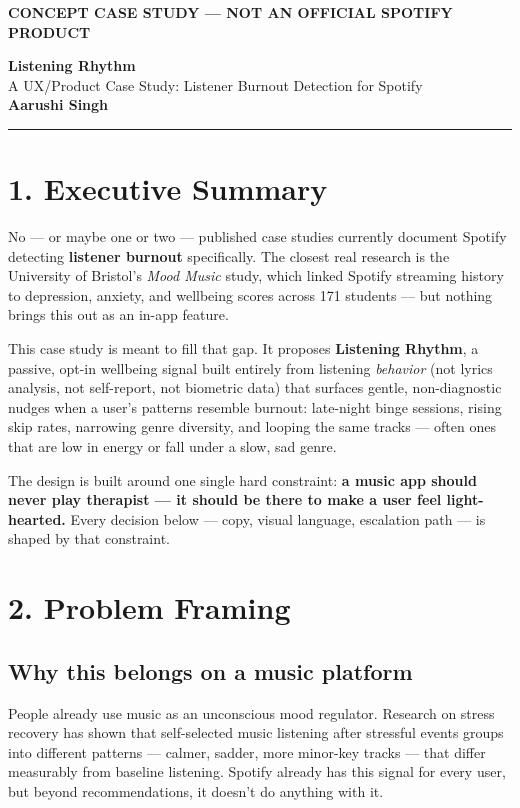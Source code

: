 \documentclass[11pt,a4paper]{article}
\newcommand{\eyebrow}[1]{{\small\color{violetaccent}\textbf{\MakeUppercase{#1}}}\par\vspace{2pt}}
\begin{document}
\begin{center}
  {\eyebrow{Concept case study --- not an official Spotify product}}
  {\Huge\bfseries Listening Rhythm}\\[6pt]
  {\large\color{softgray} A UX/Product Case Study: Listener Burnout Detection for Spotify}\\[10pt]
  {\normalsize\bfseries Aarushi Singh}
\end{center}
\vspace{1.2em}
\hrule
\vspace{1.5em}

\section*{1. Executive Summary}
No --- or maybe one or two --- published case studies currently document Spotify detecting \textbf{listener burnout} specifically. The closest real research is the University of Bristol's \emph{Mood Music} study, which linked Spotify streaming history to depression, anxiety, and wellbeing scores across 171 students --- but nothing brings this out as an in-app feature.

This case study is meant to fill that gap. It proposes \textbf{Listening Rhythm}, a passive, opt-in wellbeing signal built entirely from listening \emph{behavior} (not lyrics analysis, not self-report, not biometric data) that surfaces gentle, non-diagnostic nudges when a user's patterns resemble burnout: late-night binge sessions, rising skip rates, narrowing genre diversity, and looping the same tracks --- often ones that are low in energy or fall under a slow, sad genre.

The design is built around one single hard constraint: \textbf{a music app should never play therapist --- it should be there to make a user feel light-hearted.} Every decision below --- copy, visual language, escalation path --- is shaped by that constraint.

\section*{2. Problem Framing}

\subsection*{Why this belongs on a music platform}
People already use music as an unconscious mood regulator. Research on stress recovery has shown that self-selected music listening after stressful events groups into different patterns --- calmer, sadder, more minor-key tracks --- that differ measurably from baseline listening. Spotify already has this signal for every user, but beyond recommendations, it doesn't do anything with it.
\end{document}
